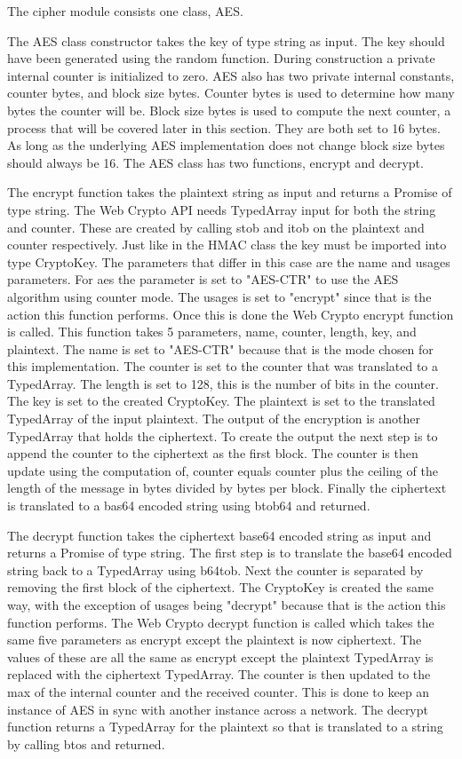 The cipher module consists one class, AES.


The AES class constructor takes the key of type string as input. The key should have been generated using the random function. During construction a private internal counter is initialized to zero. AES also has two private internal constants, counter bytes, and block size bytes. Counter bytes is used to determine how many bytes the counter will be. Block size bytes is used to compute the next counter, a process that will be covered later in this section. They are both set to 16 bytes. As long as the underlying AES implementation does not change block size bytes should always be 16. The AES class has two functions, encrypt and decrypt.


The encrypt function takes the plaintext string as input and returns a Promise of type string. The Web Crypto API needs TypedArray input for both the string and counter. These are created by calling stob and itob on the plaintext and counter respectively. Just like in the HMAC class the key must be imported into type CryptoKey. The parameters that differ in this case are the name and usages parameters. For aes the parameter is set to "AES-CTR" to use the AES algorithm using counter mode. The usages is set to "encrypt" since that is the action this function performs. Once this is done the Web Crypto encrypt function is called. This function takes 5 parameters, name, counter, length, key, and plaintext. The name is set to "AES-CTR" because that is the mode chosen for this implementation. The counter is set to the counter that was translated to a TypedArray. The length is set to 128, this is the number of bits in the counter. The key is set to the created CryptoKey. The plaintext is set to the translated TypedArray of the input plaintext. The output of the encryption is another TypedArray that holds the ciphertext. To create the output the next step is to append the counter to the ciphertext as the first block. The counter is then update using the computation of, counter equals counter plus the ceiling of the length of the message in bytes divided by bytes per block. Finally the ciphertext is translated to a bas64 encoded string using btob64 and returned.


The decrypt function takes the ciphertext base64 encoded string as input and returns a Promise of type string. The first step is to translate the base64 encoded string back to a TypedArray using b64tob. Next the counter is separated by removing the first block of the ciphertext. The CryptoKey is created the same way, with the exception of usages being "decrypt" because that is the action this function performs. The Web Crypto decrypt function is called which takes the same five parameters as encrypt except the plaintext is now ciphertext. The values of these are all the same as encrypt except the plaintext TypedArray is replaced with the ciphertext TypedArray. The counter is then updated to the max of the internal counter and the received counter. This is done to keep an instance of AES in sync with another instance across a network. The decrypt function returns a TypedArray for the plaintext so that is translated to a string by calling btos and returned.


